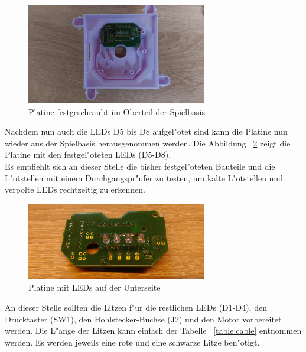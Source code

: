 \vspace{1cm}
\begin{figure}[!ht]
	\centering
  	\includegraphics[width=0.7\textwidth]{pictures/loolou_019.jpg}
	\caption{Platine festgeschraubt im Oberteil der Spielbasis}
	\label{fig19}
\end{figure}
\vspace{0.5cm}

Nachdem nun auch die LEDs D5 bis D8 aufgel"otet sind kann die Platine nun wieder aus der Spielbasis herausgenommen werden. Die Abbildung ~\ref{fig20} zeigt die Platine mit den festgel"oteten LEDs (D5-D8). \\
Es empfiehlt sich an dieser Stelle die bisher festgel"oteten Bauteile und die L"otstellen mit einem Durchgangspr"ufer zu testen, um kalte L"otstellen und verpolte LEDs rechtzeitig zu erkennen.

\vspace{1cm}
\begin{figure}[!ht]
	\centering
  	\includegraphics[width=0.7\textwidth]{pictures/loolou_020.jpg}
	\caption{Platine mit LEDs auf der Unterseite}
	\label{fig20}
\end{figure}
\vspace{0.5cm}

An dieser Stelle sollten die Litzen f"ur die restlichen LEDs (D1-D4), den Drucktaster (SW1), den Hohlstecker-Buchse (J2) und den Motor vorbereitet werden. Die L"ange der Litzen kann einfach der Tabelle ~\ref{table:cable} entnommen werden. Es werden jeweils eine rote und eine schwarze Litze ben"otigt.

